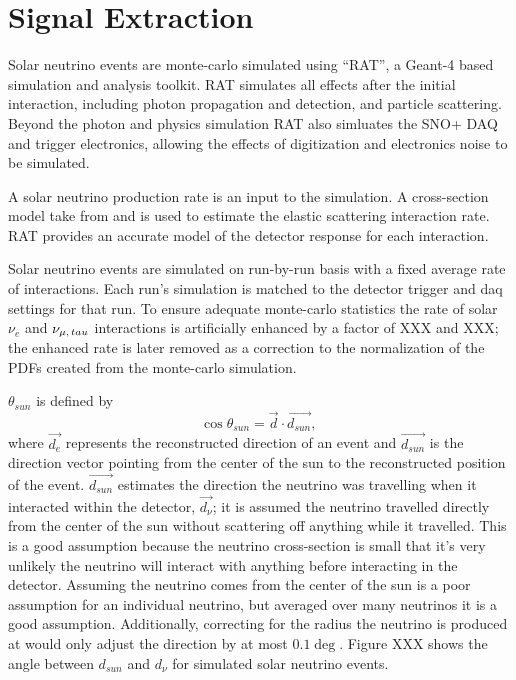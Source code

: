 \chapter{Signal Extraction}

\ifpdf
    \graphicspath{{sigex/figures/PNG/}{sigex/figures/PDF/}{sigex/figures/}}
\else
    \graphicspath{{sigex/figures/EPS/}{sigex/figures/}}
\fi


Solar neutrino events are monte-carlo simulated using ``RAT'', a Geant-4 based
simulation and analysis toolkit.
RAT simulates all effects after the initial interaction, including photon
propagation and detection, and particle scattering.
Beyond the photon and physics simulation RAT also simluates the SNO+ DAQ and trigger electronics,
allowing the effects of digitization and electronics noise to be simulated.

A solar neutrino production rate is an input to the simulation.
A cross-section model take from \cite{bahcall} and \cite{lookitup}
is used to estimate the elastic scattering interaction rate.
RAT provides an accurate model of the detector response for each interaction.

Solar neutrino events are simulated on run-by-run basis with a fixed average rate
of interactions.
Each run's simulation is matched to the detector trigger and
daq settings for that run. To ensure adequate monte-carlo statistics the
rate of solar $\nu_{e}$ and $\nu_{\mu\text{,\,}tau}$ interactions is artificially
enhanced by a factor of XXX and XXX; the enhanced rate is later removed as a correction
to the normalization of the PDFs created from the monte-carlo simulation.

$\theta_{sun}$ is defined by
\begin{equation}
\cos\theta_{sun} = \vec{d}\cdot\vec{d_{sun}}\text{, }
\end{equation}
where $\vec{d_{e}}$ represents the reconstructed direction of an event and
$\vec{d_{sun}}$ is the direction vector pointing from the center of the sun to
the reconstructed position of the event.
$\vec{d_{sun}}$ estimates the direction the neutrino was travelling when it interacted
within the detector, $\vec{d_{\nu}}$; it is assumed the neutrino travelled directly
from the center of the sun without scattering off anything while it travelled.
This is a good assumption because the neutrino cross-section is small that it's very
unlikely the neutrino will interact with anything before interacting in the detector.
Assuming the neutrino comes from the center of the sun is a poor assumption for an individual
neutrino, but averaged over many neutrinos it is a good assumption.
Additionally, correcting for the radius the neutrino is produced at would only adjust
the direction by at most $0.1\deg$.
Figure XXX shows the angle between $d_{sun}$ and $d_{\nu}$ for simulated solar neutrino
events.

